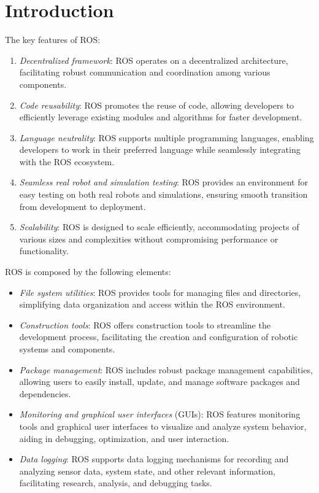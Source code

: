 \section{Introduction}

The key features of ROS:\@
\begin{enumerate}
    \item \textit{Decentralized framework}: ROS operates on a decentralized architecture, facilitating robust communication and coordination among various components.
    \item \textit{Code reusability}: ROS promotes the reuse of code, allowing developers to efficiently leverage existing modules and algorithms for faster development.
    \item \textit{Language neutrality}: ROS supports multiple programming languages, enabling developers to work in their preferred language while seamlessly integrating with the ROS ecosystem.
    \item \textit{Seamless real robot and simulation testing}: ROS provides an environment for easy testing on both real robots and simulations, ensuring smooth transition from development to deployment.
    \item \textit{Scalability}: ROS is designed to scale efficiently, accommodating projects of various sizes and complexities without compromising performance or functionality.
\end{enumerate}
ROS is composed by the following elements: 
\begin{itemize}
    \item \textit{File system utilities}: ROS provides tools for managing files and directories, simplifying data organization and access within the ROS environment.
    \item \textit{Construction tools}: ROS offers construction tools to streamline the development process, facilitating the creation and configuration of robotic systems and components.
    \item \textit{Package management}: ROS includes robust package management capabilities, allowing users to easily install, update, and manage software packages and dependencies.
    \item \textit{Monitoring and graphical user interfaces} (GUIs): ROS features monitoring tools and graphical user interfaces to visualize and analyze system behavior, aiding in debugging, optimization, and user interaction.
    \item \textit{Data logging}: ROS supports data logging mechanisms for recording and analyzing sensor data, system state, and other relevant information, facilitating research, analysis, and debugging tasks.
\end{itemize}